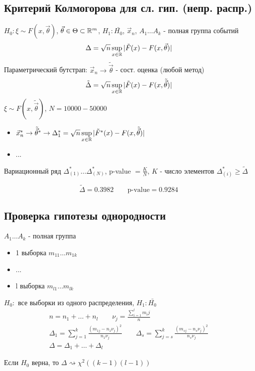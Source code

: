 \documentclass{article}
\begin{document}
\subsection{Критерий Колмогорова для сл. гип. (непр. распр.)}
$H_0: \xi \sim F(x, \vec{\theta})$, $\vec{\theta} \in \Theta \subset \mathbb{R}^{m}$,
$H_1:\bar{H_0}$, $\vec{x}_n$, $A_1\dots A_k$ - полная группа событий
\begin{gather*}
  \Delta = \sqrt{n}\sup \limits_{x\in \mathbb{R}}|\tilde{F}(x)-F(x, \vec{\theta})|
\end{gather*}
Параметрический бутстрап: $\vec{x}_n \rightarrow \tilde{\vec{\theta}}$ - сост. оценка (любой метод)
\begin{gather*}
  \tilde{\Delta} = \sqrt{n}\sup \limits_{x\in \mathbb{R}}|\tilde{F}(x)-F(x, \tilde{\vec{\theta}})|
\end{gather*}
$\xi \sim F(x, \tilde{\vec{\theta}})$, $N=10 0 0 0 - 50 0 0 0$
\begin{itemize}
  \item $\vec{x}_n^{*} \rightarrow \tilde{\vec{\theta}}^{*} \rightarrow \Delta_1^{*}=\sqrt{n}\sup \limits_{x\in\mathbb{R}}|\tilde{F}^{*}(x)-F(x, \tilde{\vec{\theta}})|$
  \item ...
\end{itemize}
Вариационный ряд $\Delta_{(1)}^{*}\dots \Delta_{(N)}^{*}$, p-value $=\frac{K}{N}$,
$K$ - число элементов $\Delta_{(i)}^{*} \ge \tilde{\Delta}$
\begin{eg}[Эрланг]
  \[
    \tilde{\Delta}=0.3982 \qquad \text{p-value}=0.9284
  \]
\end{eg}

\subsection{Проверка гипотезы однородности}
$A_1\dots A_{k}$ - полная группа
\begin{itemize}
  \item 1 выборка $m_{11}\dots m_{1k}$
  \item ...
  \item l выборка $m_{l1}\dots m_{lk}$
\end{itemize}
$H_0:$ все выборки из одного распределения, $H_1:\bar{H_0}$
\begin{gather*}
  n = n_1 + \dots  + n_l \qquad \nu_{j}=\frac{\sum_{i=1}^{l}m_ij}{n} \\ 
  \Delta_1=\sum_{j=1}^{k}\frac{(m_{1j}-n_1\nu_j)^{2}}{n_1\nu_j} \qquad
  \Delta_s=\sum_{j=s}^{k}\frac{(m_{sj}-n_s\nu_j)^{2}}{n_s\nu_j} \\ 
  \Delta = \Delta_1+ \dots + \Delta_l
\end{gather*}
\begin{theorem}
  Если $H_0$ верна, то $\Delta \rightsquigarrow \chi^{2}((k-1)(l-1))$
\end{theorem}
\end{document}
